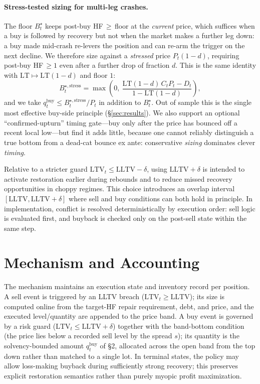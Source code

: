 \documentclass[12pt]{article}
\begin{document}
\paragraph{Stress-tested sizing for multi-leg crashes.} The floor $B_t^{\star}$ keeps post-buy HF$\,\ge\,$floor at the \emph{current} price, which suffices when a buy is followed by recovery but not when the market makes a further leg down: a buy made mid-crash re-levers the position and can re-arm the trigger on the next decline. We therefore size against a \emph{stressed} price $P_t(1-d)$, requiring post-buy HF$\,\ge 1$ even after a further drop of fraction $d$. This is the same identity with $\mathrm{LT}\mapsto\mathrm{LT}(1-d)$ and floor $1$:
\[
B_t^{\star,\text{stress}}=\max\!\left(0,\ \frac{\mathrm{LT}(1-d)\,C_tP_t-D_t}{1-\mathrm{LT}(1-d)}\right),
\]
and we take $q_t^{\text{buy}}\le B_t^{\star,\text{stress}}/P_t$ in addition to $B_t^{\star}$. Out of sample this is the single most effective buy-side principle (\S\ref{sec:results}). We also support an optional ``confirmed-upturn'' timing gate---buy only after the price has bounced off a recent local low---but find it adds little, because one cannot reliably distinguish a true bottom from a dead-cat bounce ex ante: conservative \emph{sizing} dominates clever \emph{timing}.

Relative to a stricter guard $\mathrm{LTV}_t\le\mathrm{LLTV}-\delta$, using $\mathrm{LLTV}+\delta$ is intended to activate restoration earlier during rebounds and to reduce missed recovery opportunities in choppy regimes. This choice introduces an overlap interval $[\mathrm{LLTV},\mathrm{LLTV}+\delta]$ where sell and buy conditions can both hold in principle. In implementation, conflict is resolved deterministically by execution order: sell logic is evaluated first, and buyback is checked only on the post-sell state within the same step.

\section{Mechanism and Accounting}
The mechanism maintains an execution state and inventory record per position. A sell event is triggered by an LLTV breach ($\mathrm{LTV}_t\ge\mathrm{LLTV}$); its size is computed online from the target-HF repair requirement, debt, and price, and the executed level/quantity are appended to the price band. A buy event is governed by a risk guard ($\mathrm{LTV}_t\le\mathrm{LLTV}+\delta$) together with the band-bottom condition (the price lies below a recorded sell level by the spread $s$); its quantity is the solvency-bounded amount $q_t^{\text{buy}}$ of \S2, allocated across the open band from the top down rather than matched to a single lot. In terminal states, the policy may allow loss-making buyback during sufficiently strong recovery; this preserves explicit restoration semantics rather than purely myopic profit maximization.
\end{document}
